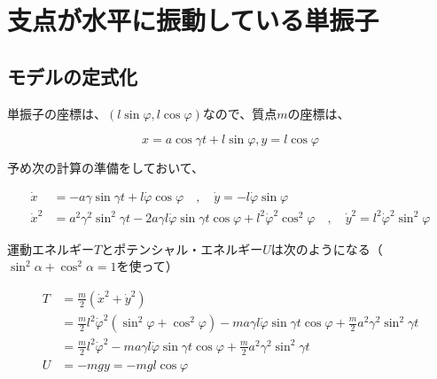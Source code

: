 \chapter{支点が水平に振動している単振子}

\section{モデルの定式化}

\begin{comment}
    \begin{figure}[htbp]
        \begin{minipage}[b]{0.45\linewidth}
          \centering
          \texttt{[image: horizontal.eps]}
          \caption{支点が水平に振動している単振子}
        \end{minipage}
      \end{figure}
\end{comment}

単振子の座標は、$(l\sin\varphi,l\cos\varphi)$なので、質点$m$の座標は、

\[x=a\cos\gamma t + l\sin\varphi, y = l\cos\varphi\]

予め次の計算の準備をしておいて、

\begin{align*}
   \dot{x} &= -a\gamma\sin\gamma t +l\dot{\varphi}\cos\varphi \quad,\quad \dot{y} = -l\dot{\varphi}\sin\varphi\\
   \dot{x}^2 &= a^2\gamma^2\sin^2\gamma t - 2a\gamma l\dot{\varphi}\sin\gamma t\cos\varphi + l^2\dot{\varphi}^2\cos^2\varphi\quad,\quad \dot{y}^2 =l^2\dot{\varphi}^2\sin^2\varphi
\end{align*}

運動エネルギー$T$とポテンシャル・エネルギー$U$は次のようになる（$\sin^2\alpha+\cos^2\alpha=1$を使って）

\begin{align*}
   T &= \frac{m}{2}(\dot{x}^2+\dot{y}^2)\\
   &=\frac{m}{2}l^2\dot{\varphi}^2\left(\sin^2\varphi+\cos^2\varphi\right) -ma\gamma l\dot{\varphi}\sin\gamma t\cos\varphi + \frac{m}{2}a^2\gamma^2\sin^2\gamma t\\
   &=\frac{m}{2}l^2\dot{\varphi}^2 -ma\gamma l\dot{\varphi}\sin\gamma t\cos\varphi + \frac{m}{2}a^2\gamma^2\sin^2\gamma t\\
   U &= -mgy = -mgl\cos\varphi
\end{align*}

